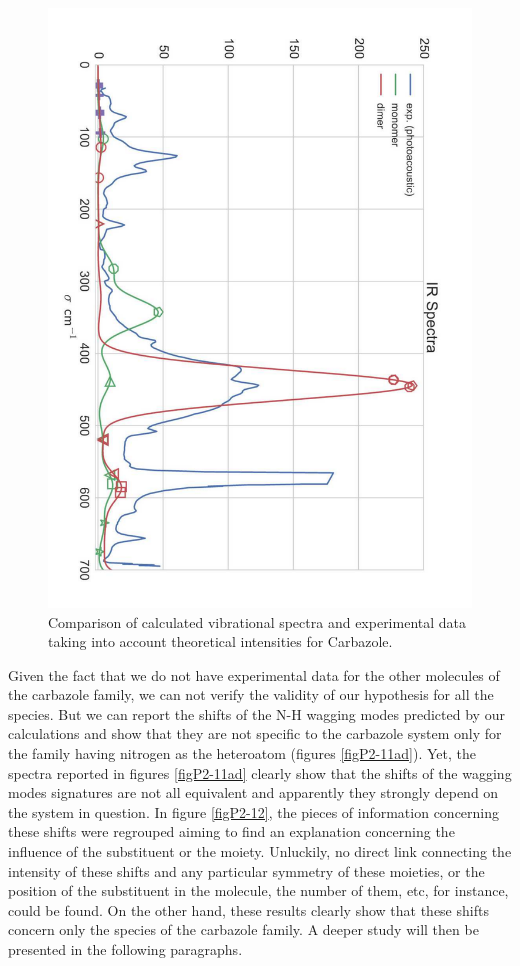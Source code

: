 	 	\begin{figure}[H]
	 		\begin{center}
	 			\includegraphics[angle=90,scale=0.5]{image/10}
	 		\end{center}
	 		\caption{Comparison of calculated vibrational spectra and experimental data taking into account theoretical intensities for Carbazole.}  \label{figP2-10}
	 	\end{figure}
	 
	 Given the fact that we do not have experimental data for the other molecules of the carbazole family, we can not verify the validity of our hypothesis for all the species. But we can report the shifts of the N-H wagging modes predicted by our calculations and show that they are not specific to the carbazole system only for the family having nitrogen as the heteroatom (figures \ref{figP2-11ad}). Yet, the spectra reported in figures \ref{figP2-11ad} clearly show that the shifts of the wagging modes signatures are not all equivalent and apparently they strongly depend on the system in question. In figure \ref{figP2-12}, the pieces of information concerning these shifts were regrouped aiming to find an explanation concerning the influence of the substituent or the moiety. Unluckily, no direct link connecting the intensity of these shifts and any particular symmetry of these moieties, or the position of the substituent in the molecule, the number of them, etc, for instance, could be found. On the other hand, these results clearly show that these shifts concern only the species of the carbazole family. A deeper study will then be presented in the following paragraphs. 
	
